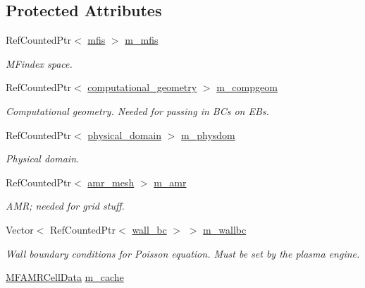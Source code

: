 \subsection*{Protected Attributes}
\begin{DoxyCompactItemize}
\item 
Ref\+Counted\+Ptr$<$ \hyperlink{classmfis}{mfis} $>$ \hyperlink{classpoisson__solver_ad296eec03cf6d9b7b12856adbb2f8cf8}{m\+\_\+mfis}
\begin{DoxyCompactList}\small\item\em M\+Findex space. \end{DoxyCompactList}\item 
Ref\+Counted\+Ptr$<$ \hyperlink{classcomputational__geometry}{computational\+\_\+geometry} $>$ \hyperlink{classpoisson__solver_a5f6ffa00da060ea245b7d87016be451a}{m\+\_\+compgeom}
\begin{DoxyCompactList}\small\item\em Computational geometry. Needed for passing in B\+Cs on E\+Bs. \end{DoxyCompactList}\item 
Ref\+Counted\+Ptr$<$ \hyperlink{classphysical__domain}{physical\+\_\+domain} $>$ \hyperlink{classpoisson__solver_a09eab2bbcd32775c9622fef8b862a4e2}{m\+\_\+physdom}
\begin{DoxyCompactList}\small\item\em Physical domain. \end{DoxyCompactList}\item 
Ref\+Counted\+Ptr$<$ \hyperlink{classamr__mesh}{amr\+\_\+mesh} $>$ \hyperlink{classpoisson__solver_a7bf7e0b22b2c597d6e287e322b0ba8fa}{m\+\_\+amr}
\begin{DoxyCompactList}\small\item\em A\+MR; needed for grid stuff. \end{DoxyCompactList}\item 
Vector$<$ Ref\+Counted\+Ptr$<$ \hyperlink{classwall__bc}{wall\+\_\+bc} $>$ $>$ \hyperlink{classpoisson__solver_aacdcbf78b6b7685f05a4aec0ba552567}{m\+\_\+wallbc}
\begin{DoxyCompactList}\small\item\em Wall boundary conditions for Poisson equation. Must be set by the plasma engine. \end{DoxyCompactList}\item 
\hyperlink{type__definitions_8H_aced885351d40daa466564acbee4042d3}{M\+F\+A\+M\+R\+Cell\+Data} \hyperlink{classpoisson__solver_addea5f25694c74b27814db5136891b74}{m\+\_\+cache}

\end{DoxyCompactItemize}
